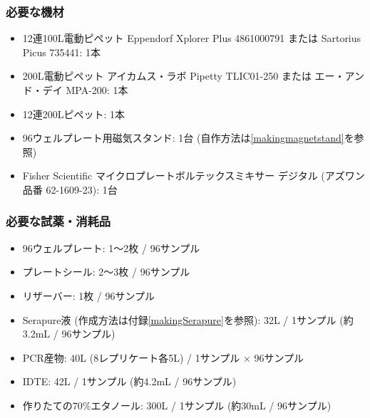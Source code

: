 \documentclass[titlepage,10pt,a4paper,uplatex]{jsbook}
\begin{document}
\subsubsection{必要な機材}
\begin{itemize}
\item 12連100{\textmu}L電動ピペット Eppendorf Xplorer Plus 4861000791 または Sartorius Picus 735441: 1本
\item 200{\textmu}L電動ピペット アイカムス・ラボ Pipetty TLIC01-250 または エー・アンド・デイ MPA-200: 1本
\item 12連200{\textmu}Lピペット: 1本
\item 96ウェルプレート用磁気スタンド: 1台 (自作方法は\ref{makingmagnetstand}を参照)
\item Fisher Scientific マイクロプレートボルテックスミキサー デジタル (アズワン品番 62-1609-23): 1台
\end{itemize}

\subsubsection{必要な試薬・消耗品}
\begin{itemize}
\item 96ウェルプレート: 1～2枚 / 96サンプル
\item プレートシール: 2～3枚 / 96サンプル
\item リザーバー: 1枚 / 96サンプル
\item Serapure液 (作成方法は付録\ref{makingSerapure}を参照): 32{\textmu}L / 1サンプル (約3.2mL / 96サンプル)
\item PCR産物: 40{\textmu}L (8レプリケート各5{\textmu}L) / 1サンプル × 96サンプル
\item IDTE: 42{\textmu}L / 1サンプル (約4.2mL / 96サンプル)
\item 作りたての70\%エタノール: 300{\textmu}L / 1サンプル (約30mL / 96サンプル)
\end{itemize}
\end{document}
